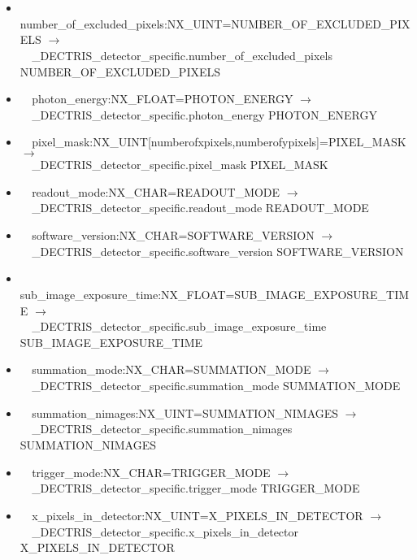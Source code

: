 \documentclass[11pt]{article}
\begin{document}
{{\begin{itemize}
\item{\verb|  |number\_of\_excluded\_pixels:NX\_UINT=NUMBER\_OF\_EXCLUDED\_PIXELS $\rightarrow$\\
\verb|  |\_DECTRIS\_detector\_specific.number\_of\_excluded\_pixels NUMBER\_OF\_EXCLUDED\_PIXELS}

\item{\verb|  |photon\_energy:NX\_FLOAT=PHOTON\_ENERGY $\rightarrow$\\
\verb|  |\_DECTRIS\_detector\_specific.photon\_energy PHOTON\_ENERGY}

\item{\verb|  |pixel\_mask:NX\_UINT[numberofxpixels,numberofypixels]=PIXEL\_MASK $\rightarrow$\\
\verb|  |\_DECTRIS\_detector\_specific.pixel\_mask PIXEL\_MASK}

\item{\verb|  |readout\_mode:NX\_CHAR=READOUT\_MODE $\rightarrow$\\
\verb|  |\_DECTRIS\_detector\_specific.readout\_mode READOUT\_MODE}

\item{\verb|  |software\_version:NX\_CHAR=SOFTWARE\_VERSION $\rightarrow$\\
\verb|  |\_DECTRIS\_detector\_specific.software\_version SOFTWARE\_VERSION}

\item{\verb|  |sub\_image\_exposure\_time:NX\_FLOAT=SUB\_IMAGE\_EXPOSURE\_TIME $\rightarrow$\\
\verb|  |\_DECTRIS\_detector\_specific.sub\_image\_exposure\_time SUB\_IMAGE\_EXPOSURE\_TIME}

\item{\verb|  |summation\_mode:NX\_CHAR=SUMMATION\_MODE $\rightarrow$\\
\verb|  |\_DECTRIS\_detector\_specific.summation\_mode SUMMATION\_MODE}

\item{\verb|  |summation\_nimages:NX\_UINT=SUMMATION\_NIMAGES $\rightarrow$\\
\verb|  |\_DECTRIS\_detector\_specific.summation\_nimages SUMMATION\_NIMAGES}

\item{\verb|  |trigger\_mode:NX\_CHAR=TRIGGER\_MODE $\rightarrow$\\
\verb|  |\_DECTRIS\_detector\_specific.trigger\_mode TRIGGER\_MODE}

\item{\verb|  |x\_pixels\_in\_detector:NX\_UINT=X\_PIXELS\_IN\_DETECTOR $\rightarrow$\\
\verb|  |\_DECTRIS\_detector\_specific.x\_pixels\_in\_detector X\_PIXELS\_IN\_DETECTOR}


\end{itemize}}}
\end{document}
